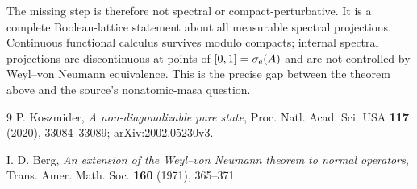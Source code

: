 \documentclass[11pt]{article}
\begin{document}
The missing step is therefore not spectral or compact-perturbative.  It is a
complete Boolean-lattice statement about all measurable spectral projections.
Continuous functional calculus survives modulo compacts; internal spectral
projections are discontinuous at points of $[0,1]=\sigma_{\rm e}(A)$ and are
not controlled by Weyl--von Neumann equivalence.  This is the precise gap
between the theorem above and the source's nonatomic-masa question.

\begin{thebibliography}{9}
P. Koszmider, \emph{A non-diagonalizable pure state}, Proc. Natl. Acad. Sci.
USA \textbf{117} (2020), 33084--33089; arXiv:2002.05230v3.

I. D. Berg, \emph{An extension of the Weyl--von Neumann theorem to normal
operators}, Trans. Amer. Math. Soc. \textbf{160} (1971), 365--371.
\end{thebibliography}
\end{document}

